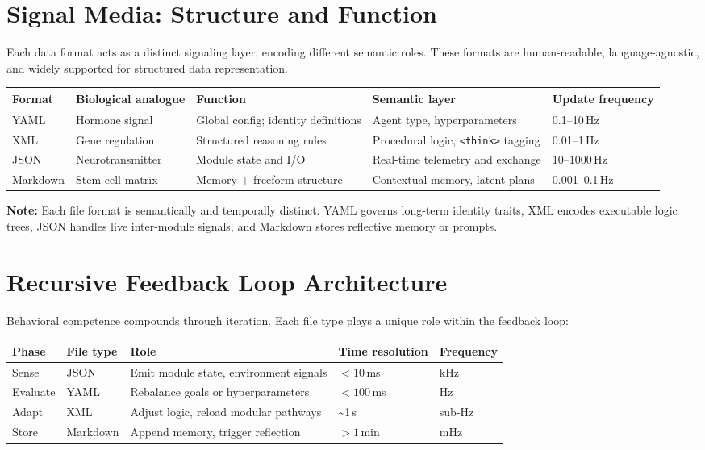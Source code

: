 \documentclass{article}
\begin{document}
\section{Signal Media: Structure and Function}
Each data format acts as a distinct signaling layer, encoding different semantic roles. These formats are human-readable, language-agnostic, and widely supported for structured data representation.

\begin{longtable}{|P{2.4cm}|P{3.2cm}|P{4.1cm}|P{4.6cm}|P{2.2cm}|}
\hline
\textbf{Format} & \textbf{Biological analogue} & \textbf{Function} & \textbf{Semantic layer} & \textbf{Update frequency} \\
\hline
YAML     & Hormone signal     & Global config; identity definitions   & Agent type, hyperparameters       & 0.1--10\,Hz \\
XML      & Gene regulation    & Structured reasoning rules            & Procedural logic, \texttt{<think>} tagging & 0.01--1\,Hz \\
JSON     & Neurotransmitter   & Module state and I/O                  & Real-time telemetry and exchange  & 10--1000\,Hz \\
Markdown & Stem-cell matrix   & Memory + freeform structure           & Contextual memory, latent plans   & 0.001--0.1\,Hz \\
\hline
\end{longtable}

\textbf{Note:} Each file format is semantically and temporally distinct. YAML governs long-term identity traits, XML encodes executable logic trees, JSON handles live inter-module signals, and Markdown stores reflective memory or prompts.

\section{Recursive Feedback Loop Architecture}
Behavioral competence compounds through iteration. Each file type plays a unique role within the feedback loop:

\begin{longtable}{|P{2.2cm}|P{2.7cm}|P{4.2cm}|P{3.2cm}|P{2.1cm}|}
\hline
\textbf{Phase} & \textbf{File type} & \textbf{Role} & \textbf{Time resolution} & \textbf{Frequency} \\
\hline
Sense    & JSON      & Emit module state, environment signals & $<\!10$\,ms     & kHz \\
Evaluate & YAML      & Rebalance goals or hyperparameters     & $<\!100$\,ms    & Hz  \\
Adapt    & XML       & Adjust logic, reload modular pathways  & \textasciitilde1\,s      & sub-Hz \\
Store    & Markdown  & Append memory, trigger reflection      & $>\!1$\,min     & mHz  \\
\hline
\end{longtable}
\end{document}
